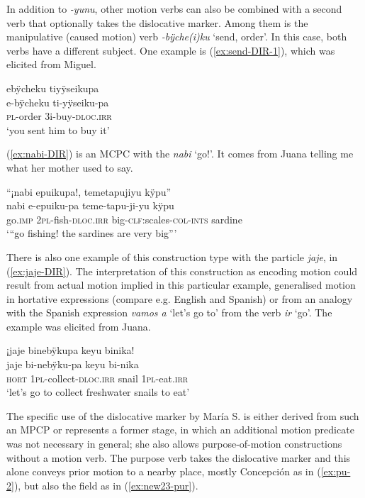 In addition to \textit{-yunu}, other motion verbs can also be combined with a second verb that optionally takes the dislocative marker. Among them is the manipulative (caused motion) verb \textit{-bÿche(i)ku} ‘send, order’. In this case, both verbs have a different subject. One example is (\ref{ex:send-DIR-1}), which was elicited from Miguel.

\ea\label{ex:send-DIR-1}
\begingl 
\glpreamble ebÿcheku tiyÿseikupa\\
\gla e-bÿcheku ti-yÿseiku-pa\\ 
\textsc{pl}-order 3i-buy-\textsc{dloc.irr}\\ 
\glft ‘you sent him to buy it’
\xe

(\ref{ex:nabi-DIR}) is an MCPC with the  \textit{nabi} ‘go!’. It comes from Juana telling me what her mother used to say.


\ea\label{ex:nabi-DIR}
\begingl 
\glpreamble “¡nabi epuikupa!, temetapujiyu kÿpu”\\
\gla nabi e-epuiku-pa teme-tapu-ji-yu kÿpu\\ 
\glb go.\textsc{imp} 2\textsc{pl}-fish-\textsc{dloc.irr} big-\textsc{clf:}scales-\textsc{col}-\textsc{ints} sardine\\ 
\glft ‘“go fishing! the sardines are very big”’
\trailingcitation{[jxx-e150925l-1.160]}
\xe

There is also one example of this construction type with the  particle \textit{jaje}, in (\ref{ex:jaje-DIR}). The interpretation of this construction as encoding motion could result from actual motion implied in this particular example, generalised motion in hortative expressions (compare e.g. English and Spanish) or from an analogy with the Spanish  expression \textit{vamos a} ‘let's go to’ from the verb \textit{ir} ‘go’. The example was elicited from Juana.

\ea\label{ex:jaje-DIR}
\begingl 
\glpreamble ¡jaje binebÿkupa keyu binika!\\
\gla jaje bi-nebÿku-pa keyu bi-nika\\ 
\glb \textsc{hort} 1\textsc{pl}-collect-\textsc{dloc.irr} snail 1\textsc{pl}-eat.\textsc{irr}\\ 
\glft ‘let's go to collect freshwater snails to eat’
\trailingcitation{[jxx-e081025s-1.171]}
\xe

The specific use of the dislocative marker by María S. is either derived from such an MPCP or represents a former stage, in which an additional motion predicate was not necessary in general; she also allows purpose-of-motion constructions without a motion verb. The purpose verb takes the dislocative marker and this alone conveys prior motion to a nearby place, mostly Concepción as in (\ref{ex:pu-2}), but also the field as in (\ref{ex:new23-pur}).

